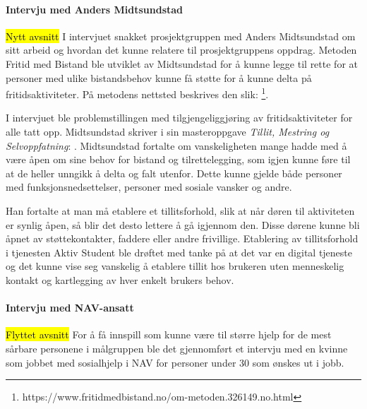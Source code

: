 \paragraph{Intervju med Anders Midtsundstad}
\hl{Nytt avsnitt}
I intervjuet snakket prosjektgruppen med Anders Midtsundstad om sitt arbeid og hvordan det kunne relatere til prosjektgruppens oppdrag. Metoden Fritid med Bistand ble utviklet av Midtsundstad for å kunne legge til rette for at personer med ulike bistandsbehov kunne få støtte for å kunne delta på fritidsaktiviteter. På metodens nettsted beskrives den slik:  \footnote{https://www.fritidmedbistand.no/om-metoden.326149.no.html}. 

I intervjuet ble problemstillingen med tilgjengeliggjøring av fritidsaktiviteter for alle tatt opp. Midtsundstad skriver i sin masteroppgave {\em Tillit, Mestring og Selvoppfatning}:  \cite{TILLIT:13}. Midtsundstad fortalte om vanskeligheten mange hadde med å være åpen om sine behov for bistand og tilrettelegging, som igjen kunne føre til at de heller unngikk å delta og falt utenfor. Dette kunne gjelde både personer med funksjonsnedsettelser, personer med sosiale vansker og andre. 

Han fortalte at man må etablere et tillitsforhold, slik at når døren til aktiviteten er synlig åpen, så blir det desto lettere å gå igjennom den. Disse dørene kunne bli åpnet av støttekontakter, faddere eller andre frivillige. Etablering av tillitsforhold i tjenesten Aktiv Student ble drøftet med tanke på at det var en digital tjeneste og det kunne vise seg vanskelig å etablere tillit hos brukeren uten menneskelig kontakt og kartlegging av hver enkelt brukers behov.

\paragraph{Intervju med NAV-ansatt}
\hl{Flyttet avsnitt}
For å få innspill som kunne være til større hjelp for de mest sårbare personene i målgruppen ble det gjennomført et intervju med en kvinne som jobbet med sosialhjelp i NAV for personer under 30 som ønskes ut i jobb. 

